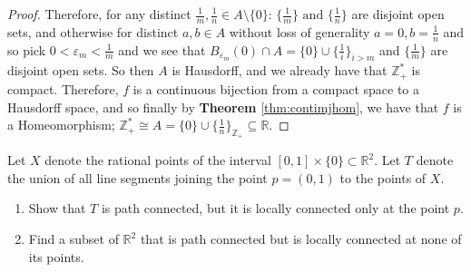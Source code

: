 \documentclass[addpoints,10pt]{exam}
\theoremstyle{plain}
\theoremstyle{definition}
\newtheorem{prob}[thm]{Problem}
\theoremstyle{plain}
\theoremstyle{definition}
\let\oldprob\prob
\let\endoldprob\endprob
\renewenvironment{prob}
  {\begin{singlespace}\oldprob}
  {\endoldprob\end{singlespace}}
\newcommand{\RR}{\ensuremath{\mathbb{R}}}
\newcommand{\ZZ}{\ensuremath{\mathbb{Z}}}
\begin{document}
\begin{proof}
 Therefore, for any distinct $\frac{1}{m},\frac{1}{n}\in A\setminus\{0\}$: $\{\frac{1}{m}\}\text{ and }\{\frac{1}{n}\}$ are disjoint open sets, and otherwise for distinct $a,b\in A$ without loss of generality $a=0,b=\frac{1}{n}$ and so pick $0<\varepsilon_{m}<\frac{1}{m}$ and we see that $B_{\varepsilon_{m}}(0)\cap A=\{0\}\cup \{\frac{1}{i}\}_{i> m}$ and $\{\frac{1}{m}\}$ are disjoint open sets. So then $A$ is Hausdorff, and we already have that $\ZZ_{+}^{*}$ is compact. Therefore, $f$ is a continuous bijection from a compact space to a Hausdorff space, and so finally by \textbf{Theorem }\ref{thm:contimjhom}, we have that $f$ is a Homeomorphism; $\ZZ_{+}^{*}\cong A=\{0\}\cup \{\frac{1}{n}\}_{\ZZ_{+}}\subseteq \RR.$

\end{proof}
\newpage

\begin{prob}
Let $X$ denote the rational points of the interval
$[0,1]\times\{0\}\subset\RR^2$. Let $T$ denote the union of all line
segments joining the point $p=(0,1)$ to the points of $X$.
\begin{enumerate}[label=(\alph*)]
    \item Show that $T$ is path connected, but it is locally connected only
    at the point $p$.
    \item Find a subset of $\RR^2$ that is path connected but is locally
    connected at none of its points.
\end{enumerate}
\end{prob}
\end{document}
